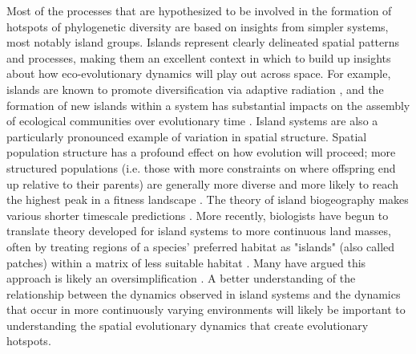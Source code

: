 %
Most of the processes that are hypothesized to be involved in the formation of hotspots of phylogenetic diversity are based on insights from simpler systems, most notably island groups. Islands represent clearly delineated spatial patterns and processes, making them an excellent context in which to build up insights about how eco-evolutionary dynamics will play out across space. For example, islands are known to promote diversification via adaptive radiation \citep{losos_adaptive_2010}, and the formation of new islands within a system has substantial impacts on the assembly of ecological communities over evolutionary time \citep{gillespie_community_2004}. Island systems are also a particularly pronounced example of variation in spatial structure. Spatial population structure has a profound effect on how evolution will proceed; more structured populations (i.e. those with more constraints on where offspring end up relative to their parents) are generally more diverse and more likely to reach the highest peak in a fitness landscape \citep{tomassini_spatially_2005,nahum_tortoisehare_2015}. The theory of island biogeography makes various shorter timescale predictions \citep{macarthur_theory_1967}. More recently, biologists have begun to translate theory developed for island systems to more continuous land masses, often by treating regions of a species' preferred habitat as "islands" (also called patches) within a matrix of less suitable habitat \citep{forman_land_1995}. Many have argued this approach is likely an oversimplification \citep{mcgarigal_surface_2009,franklin_importance_2009}. A better understanding of the relationship between the dynamics observed in island systems and the dynamics that occur in more continuously varying environments will likely be important to understanding the spatial evolutionary dynamics that create evolutionary hotspots.  


